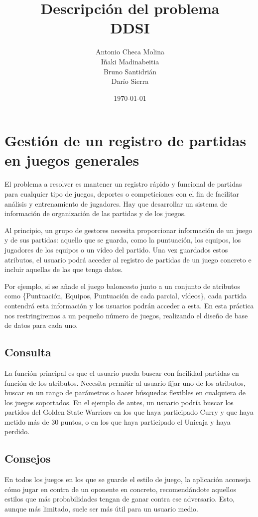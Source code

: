 \documentclass[a4paper, 11pt]{article}
\title{\Huge \textbf{Descripción del problema\\DDSI}}
\author{Antonio Checa Molina \\ Iñaki Madinabeitia \\ Bruno Santidrián \\ Darío Sierra}
\date{\today}
\begin{document}
\maketitle
\tableofcontents

\newpage
\section{Gestión de un registro de partidas en juegos generales}

El problema a resolver es mantener un registro rápido y funcional de partidas para cualquier tipo de juegos, deportes o competiciones con el fin de facilitar análisis y entrenamiento de jugadores. Hay que desarrollar un sistema de información de organización de las partidas y de los juegos.

Al principio, un grupo de gestores necesita proporcionar información de un juego y de sus partidas: aquello que se guarda, como la puntuación, los equipos, los jugadores de los equipos o un vídeo del partido. Una vez guardados estos atributos, el usuario podrá acceder al registro de partidas de un juego concreto e incluir aquellas de las que tenga datos. 

Por ejemplo, si se añade el juego baloncesto junto a un conjunto de atributos como \{Puntuación, Equipos, Puntuación de cada parcial, vídeos\}, cada partida contendrá esta información y los usuarios podrán acceder a esta. En esta práctica nos restringiremos a un pequeño número de juegos, realizando el diseño de base de datos para cada uno.

\subsection{Consulta}
La función principal es que el usuario pueda buscar con facilidad partidas en función de los atributos. Necesita permitir al usuario fijar uno de los atributos, buscar en un rango de parámetros o hacer búsquedas flexibles en cualquiera de los juegos soportados. En el ejemplo de antes, un usuario podría buscar los partidos del Golden State Warriors en los que haya participado Curry y que haya metido más de 30 puntos, o en los que haya participado el Unicaja y haya perdido.

\subsection{Consejos}
En todos los juegos en los que se guarde el estilo de juego, la aplicación aconseja cómo jugar en contra de un oponente en concreto, recomendándote aquellos estilos que más probabilidades tengan de ganar contra ese adversario. Esto, aunque más limitado, suele ser más útil para un usuario medio.
\end{document}
